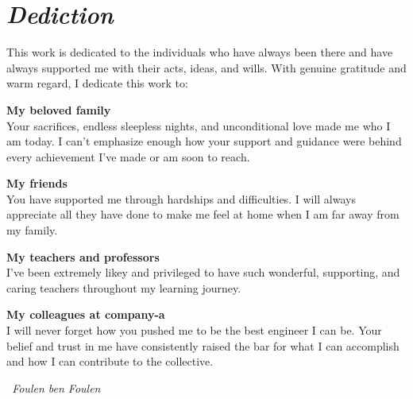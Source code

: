 \chapter*{\bf\it Dediction}

\begin{center}
\it \large

This work is dedicated to the individuals who have always been there and have always supported me with their acts, ideas, and wills.
With genuine gratitude and warm regard, I dedicate this work to: 
 \vspace{4mm}
 
 \textbf{My beloved family} \\
 Your sacrifices, endless sleepless nights, and unconditional love made me who I am today. I can't emphasize enough how your support and guidance were behind every achievement I've made or am soon to reach.
 \vspace{4mm}

  \textbf{My friends} \\
  You have supported me through hardships and difficulties. I will always appreciate all they have done to make me feel at home when I am far away from my family.\vspace{4mm}

 \textbf{My teachers and professors} \\
 I've been extremely likey and privileged to have such wonderful, supporting, and caring teachers throughout my learning journey. 
\vspace{4mm}

  \textbf{My colleagues at company-a} \\
  I will never forget how you pushed me to be the best engineer I can be. Your belief and trust in me have consistently raised the bar for what I can accomplish and how I can contribute to the collective.
  \vspace{4mm}


    \begin{flushright}
        \it \LARGE \ Foulen ben Foulen
    \end{flushright}
\end{center}

